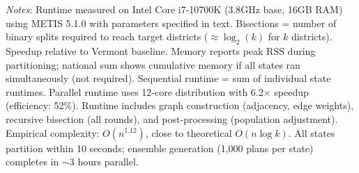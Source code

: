 \begin{table}[htbp]
\footnotesize
\textit{Notes}: Runtime measured on Intel Core i7-10700K (3.8GHz base, 16GB RAM) using METIS 5.1.0 with parameters specified in text. Bisections = number of binary splits required to reach target districts ($\approx \log_2(k)$ for $k$ districts). Speedup relative to Vermont baseline. Memory reports peak RSS during partitioning; national sum shows cumulative memory if all states ran simultaneously (not required). Sequential runtime = sum of individual state runtimes. Parallel runtime uses 12-core distribution with 6.2× speedup (efficiency: 52\%). Runtime includes graph construction (adjacency, edge weights), recursive bisection (all rounds), and post-processing (population adjustment). Empirical complexity: $O(n^{1.12})$, close to theoretical $O(n \log k)$. All states partition within 10 seconds; ensemble generation (1,000 plans per state) completes in $\sim$3 hours parallel.

\end{table}
